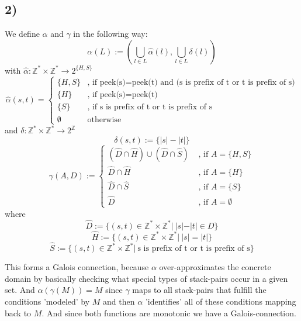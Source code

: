 \documentclass[fleqn,12pt]{article}
\begin{document}
\subsection*{2)}
We define $\alpha$ and $\gamma$ in the following way:
$$\alpha(L):= (\bigcup_{l\in L}\widehat{\alpha}(l),\bigcup_{l\in L} \delta(l))$$
with $\widehat{\alpha} : \mathbb{Z^{*}} \times \mathbb{Z^{*}} \rightarrow 2^{\{H,S\}}$
$$\widehat{\alpha}(s,t)=
\begin{cases}
	\{H,S\} &\text{, if peek(s)=peek(t) and (s is prefix of t or t is prefix of s)}\\
	\{H\} &\text{, if peek(s)=peek(t)}\\
	\{S\} &\text{, if s is prefix of t or t is prefix of s}\\
	\emptyset &\text{otherwise}
\end{cases}$$
and $\delta : \mathbb{Z^{*}} \times \mathbb{Z^{*}} \rightarrow 2^\mathbb{Z}$
$$\delta(s,t):= \{|s| - |t|\}$$
$$\gamma(A,D):=
\begin{cases}
	(\widehat{D}\cap\widehat{H})\cup(\widehat{D}\cap\widehat{S}) &\text{ , if }A = \{H,S\}\\
	\widehat{D}\cap\widehat{H} &\text{ , if }A = \{H\}\\
	\widehat{D}\cap\widehat{S} &\text{ , if }A = \{S\}\\
	\widehat{D} &\text{ , if }A = \emptyset
\end{cases}$$
where 
$$\widehat{D} := \{(s,t) \in \mathbb{Z^{*}} \times \mathbb{Z^{*}} |\ |s| -|t| \in D\}$$
$$\widehat{H} := \{(s,t) \in \mathbb{Z^{*}} \times \mathbb{Z^{*}} |\ |s| = |t| \}$$
$$\widehat{S} := \{(s,t) \in \mathbb{Z^{*}} \times \mathbb{Z^{*}} |\ \text{s is prefix of t or t is prefix of s}\}$$

This forms a Galois connection, because $\alpha$ over-approximates the concrete domain by basically checking what special types of stack-pairs occur in a given set.
And $\alpha(\gamma(M)) = M$ since $\gamma$ maps to all stack-pairs that fulfill the conditions 'modeled' by $M$ and then $\alpha$ 'identifies' all of these conditions mapping back to $M$. And since both functions are monotonic we have a Galois-connection.
\end{document}

